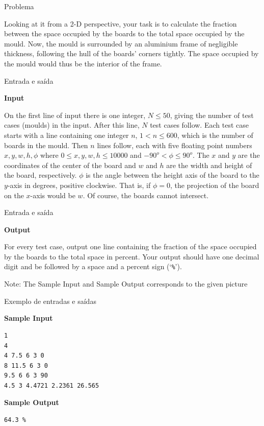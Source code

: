 \begin{frame}[fragile]{Problema}

Looking at it from a 2-D perspective, your task is to
calculate the fraction between the space occupied by the
boards to the total space occupied by the mould. Now, the
mould is surrounded by an aluminium frame of negligible
thickness, following the hull of the boards’ corners tightly.
The space occupied by the mould would thus be the interior
of the frame.

\end{frame}

\begin{frame}[fragile]{Entrada e saída}

\textbf{Input}

On the first line of input there is one integer, $N\leq 50$, giving
the number of test cases (moulds) in the input. After this line, $N$ test cases follow. 
Each test case starts with a line containing one integer $n$, $1 < n\leq 600$, which is the number 
of boards in the mould.  Then $n$ lines follow, each with five floating point numbers 
$x, y, w, h, \phi$ where $0\leq x, y, w, h\leq 10000$ and $-90^o < \phi\leq 90^o$. 
The $x$ and $y$ are the coordinates of the center of the board and $w$ and $h$ are the
width and height of the board, respectively. $\phi$ is the angle between the height axis of the 
board to the $y$-axis in degrees, positive clockwise. That is, if $\phi = 0$, the projection of 
the board on the $x$-axis would be $w$. Of course, the boards cannot intersect.

\end{frame}

\begin{frame}[fragile]{Entrada e saída}

\textbf{Output}

For every test case, output one line containing the fraction of the space occupied by the boards to the total space in percent. Your output should have one decimal digit and be followed by a space 
and a percent sign (‘\texttt{\%}’).

Note: The Sample Input and Sample Output corresponds to the given picture

\end{frame}

\begin{frame}[fragile]{Exemplo de entradas e saídas}

\begin{minipage}[t]{0.5\textwidth}
\textbf{Sample Input}
\begin{verbatim}
1
4
4 7.5 6 3 0
8 11.5 6 3 0
9.5 6 6 3 90
4.5 3 4.4721 2.2361 26.565
\end{verbatim}
\end{minipage}
\begin{minipage}[t]{0.45\textwidth}
\textbf{Sample Output}
\begin{verbatim}
64.3 %
\end{verbatim}
\end{minipage}
\end{frame}

